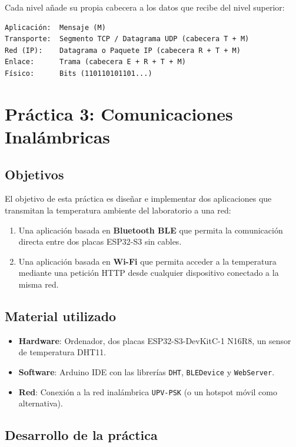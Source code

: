 Cada nivel añade su propia cabecera a los datos que recibe del nivel superior:

\begin{verbatim}
Aplicación:  Mensaje (M)
Transporte:  Segmento TCP / Datagrama UDP (cabecera T + M)
Red (IP):    Datagrama o Paquete IP (cabecera R + T + M)
Enlace:      Trama (cabecera E + R + T + M)
Físico:      Bits (110110101101...)
\end{verbatim}

\section{Práctica 3: Comunicaciones Inalámbricas}
\label{sec:practica3}

\subsection{Objetivos}

El objetivo de esta práctica es diseñar e implementar dos aplicaciones que transmitan
la temperatura ambiente del laboratorio a una red:

\begin{enumerate}
    \item Una aplicación basada en \textbf{Bluetooth BLE} que permita la comunicación
    directa entre dos placas ESP32-S3 sin cables.
    \item Una aplicación basada en \textbf{Wi-Fi} que permita acceder a la temperatura
    mediante una petición HTTP desde cualquier dispositivo conectado a la misma red.
\end{enumerate}

\subsection{Material utilizado}

\begin{itemize}
    \item \textbf{Hardware}: Ordenador, dos placas ESP32-S3-DevKitC-1 N16R8, un sensor
    de temperatura DHT11.
    \item \textbf{Software}: Arduino IDE con las librerías \texttt{DHT}, \texttt{BLEDevice}
    y \texttt{WebServer}.
    \item \textbf{Red}: Conexión a la red inalámbrica \texttt{UPV-PSK} (o un hotspot móvil
    como alternativa).
\end{itemize}

\subsection{Desarrollo de la práctica}

